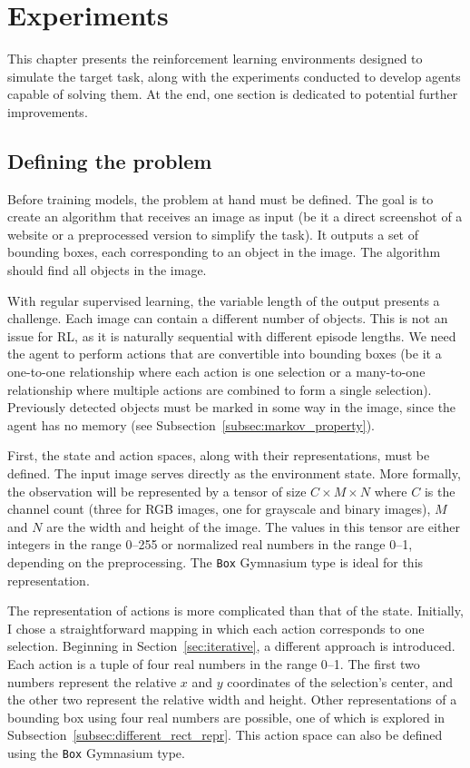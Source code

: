 \documentclass[
  digital,     %
  oneside,     %
  nosansbold,  %
  nocolorbold, %
  lof,         %
  lot,         %
]{fithesis4}
\begin{document}
\chapter{Experiments}
\label{ch:experiments}

This chapter presents the reinforcement learning environments designed to simulate the target task, along with the experiments conducted to develop agents capable of solving them. At the end, one section is dedicated to potential further improvements.

\section{Defining the problem}
\label{sec:problem_definition}

Before training models, the problem at hand must be defined. The goal is to create an algorithm that receives an image as input (be it a direct screenshot of a website or a preprocessed version to simplify the task). It outputs a set of bounding boxes, each corresponding to an object in the image. The algorithm should find all objects in the image.

With regular supervised learning, the variable length of the output presents a challenge. Each image can contain a different number of objects. This is not an issue for RL, as it is naturally sequential with different episode lengths. We need the agent to perform actions that are convertible into bounding boxes (be it a one-to-one relationship where each action is one selection or a many-to-one relationship where multiple actions are combined to form a single selection). Previously detected objects must be marked in some way in the image, since the agent has no memory (see Subsection~\ref{subsec:markov_property}).

First, the state and action spaces, along with their representations, must be defined. The input image serves directly as the environment state. More formally, the observation will be represented by a tensor of size $C\times M \times N$ where $C$ is the channel count (three for RGB images, one for grayscale and binary images), $M$ and $N$ are the width and height of the image. The values in this tensor are either integers in the range 0--255 or normalized real numbers in the range 0--1, depending on the preprocessing. The \texttt{Box} Gymnasium type is ideal for this representation.

The representation of actions is more complicated than that of the state. Initially, I chose a straightforward mapping in which each action corresponds to one selection. Beginning in Section~\ref{sec:iterative}, a different approach is introduced. Each action is a tuple of four real numbers in the range 0--1. The first two numbers represent the relative $x$ and $y$ coordinates of the selection's center, and the other two represent the relative width and height. Other representations of a bounding box using four real numbers are possible, one of which is explored in Subsection~\ref{subsec:different_rect_repr}. This action space can also be defined using the \texttt{Box} Gymnasium type.
\end{document}
